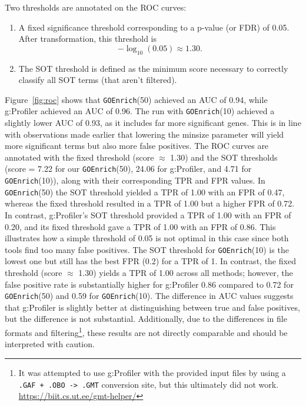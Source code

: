 \documentclass{article}
\begin{document}
    Two thresholds are annotated on the ROC curves:
    \begin{enumerate}
        \item A fixed significance threshold corresponding to a p-value (or FDR) of 0.05. After transformation, this threshold is
        \[
            -\log_{10}(0.05) \approx 1.30.
        \]
        \item The SOT threshold is defined as the minimum score necessary to correctly classify all SOT terms (that aren't filtered).
    \end{enumerate}
    Figure~\ref{fig:roc} shows that \texttt{GOEnrich}(50) achieved an AUC of 0.94, while g:Profiler achieved an AUC of 0.96. The run with \texttt{GOEnrich}(10) achieved a slightly lower AUC of 0.93, as it includes far more significant genes. This is in line with observations made earlier that lowering the minsize parameter will yield more significant terms but also more false positives. The ROC curves are annotated with the fixed threshold (score $\approx$ 1.30) and the SOT thresholds (score = 7.22 for our \texttt{GOEnrich}(50), 24.06 for g:Profiler, and 4.71 for \texttt{GOEnrich}(10)), along with their corresponding TPR and FPR values. In \texttt{GOEnrich}(50) the SOT threshold yielded a TPR of 1.00 with an FPR of 0.47, whereas the fixed threshold resulted in a TPR of 1.00 but a higher FPR of 0.72. In contrast, g:Profiler’s SOT threshold provided a TPR of 1.00 with an FPR of 0.20, and its fixed threshold gave a TPR of 1.00 with an FPR of 0.86. This illustrates how a simple threshold of 0.05 is not optimal in this case since both tools find too many false positives. The SOT threshold for \texttt{GOEnrich}(10) is the lowest one but still has the best FPR (0.2) for a TPR of 1. In contrast, the fixed threshold (score $\approx$ 1.30) yields a TPR of 1.00 across all methods; however, the false positive rate is substantially higher for g:Profiler 0.86 compared to 0.72 for \texttt{GOEnrich}(50) and 0.59 for \texttt{GOEnrich}(10). The difference in AUC values suggests that g:Profiler is slightly better at distinguishing between true and false positives, but the difference is not substantial. Additionally, due to the differences in file formats and filtering\footnote{It was attempted to use g:Profiler with the provided input files by using a \texttt{.GAF + .OBO -> .GMT} conversion site, but this ultimately did not work. \url{https://biit.cs.ut.ee/gmt-helper/}}, these results are not directly comparable and should be interpreted with caution.
\end{document}

